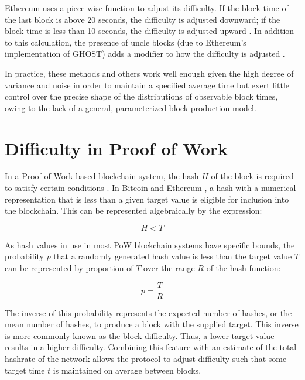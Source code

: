 \documentclass[]{article}
\begin{document}
Ethereum uses a piece-wise function to adjust its difficulty.  If the block time of the last block is above 20 seconds, the difficulty is adjusted downward; if the block time is less than 10 seconds, the difficulty is adjusted upward \cite{EthereumDifficulty}.  In addition to this calculation, the presence of uncle blocks (due to Ethereum's implementation of GHOST) adds a modifier to how the difficulty is adjusted \cite{EthereumUncles}.
\newline

In practice, these methods and others work well enough given the high degree of variance and noise in order to maintain a specified average time but exert little control over the precise shape of the distributions of observable block times, owing to the lack of a general, parameterized block production model.

\section{Difficulty in Proof of Work}
In a Proof of Work based blockchain system, the hash $H$ of the block is required to satisfy certain conditions \cite{BitcoinWhitepaper}.  In Bitcoin \cite{BitcoinPOW} and Ethereum \cite{EthereumPOW} \cite{EthereumYellowpaper}, a hash with a numerical representation that is less than a given target value is eligible for inclusion into the blockchain.  This can be represented algebraically by the expression:

\begin{equation}
H < T
\end{equation}

As hash values in use in most PoW blockchain systems have specific bounds, the probability $p$ that a randomly generated hash value is less than the target value $T$ can be represented by proportion of $T$ over the range $R$ of the hash function: 

\begin{equation}
	p = \frac{T}{R} 
\end{equation}

The inverse of this probability represents the expected number of hashes, or the mean number of hashes, to produce a block with the supplied target.  This inverse is more commonly known as the block difficulty.  Thus, a lower target value results in a higher difficulty.  Combining this feature with an estimate of the total hashrate of the network allows the protocol to adjust difficulty such that some target time $t$ is maintained on average between blocks.  
\end{document}
